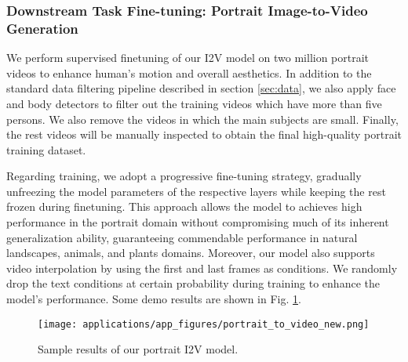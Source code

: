 \subsubsection{Downstream Task Fine-tuning: Portrait Image-to-Video Generation}
We perform supervised finetuning of our I2V model on two million portrait videos to enhance human's motion and overall aesthetics. In addition to the standard data filtering pipeline described in section \ref{sec:data}, we also apply face and body detectors to filter out the training videos which have more than five persons. We also remove the videos in which the main subjects are small. Finally, the rest videos will be manually inspected to obtain the final high-quality portrait training dataset.

Regarding training, we adopt a progressive fine-tuning strategy, gradually unfreezing the model parameters of the respective layers while keeping the rest frozen during finetuning. This approach allows the model to achieves high performance in the portrait domain without compromising much of its inherent generalization ability, guaranteeing commendable performance in natural landscapes, animals, and plants domains. Moreover, our model also supports video interpolation by using the first and last frames as conditions. We randomly drop the text conditions at certain probability during training to enhance the model's performance. Some demo results are shown in Fig. \ref{fig:portrait_i2v}.

\begin{figure}[h]
    \centering
    \texttt{[image: applications/app\_figures/portrait\_to\_video\_new.png]}
    \caption{Sample results of our portrait I2V model.}
    \label{fig:portrait_i2v}
\end{figure}